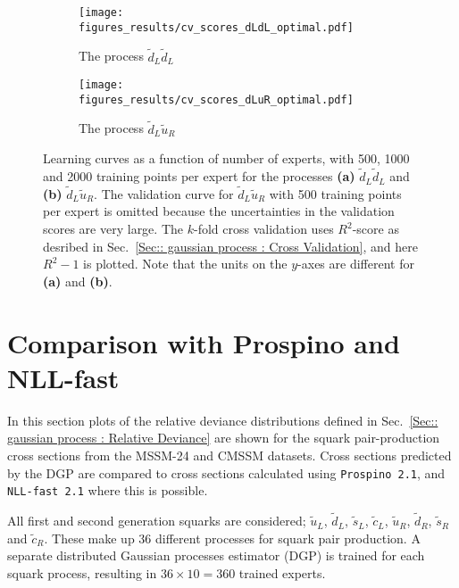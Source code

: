 \documentclass[twoside,english]{uiofysmaster}
\begin{document}
{{\begin{figure}
    \centering
    \begin{subfigure}[b]{0.7\textwidth}
        \texttt{[image: figures\_results/cv\_scores\_dLdL\_optimal.pdf]}
        \caption{The process $\widetilde{d}_L \widetilde{d}_L$}
        \label{Fig:: results : Learning curves dLdL}
    \end{subfigure}
    \begin{subfigure}[b]{0.7\textwidth}
        \texttt{[image: figures\_results/cv\_scores\_dLuR\_optimal.pdf]}
        \caption{The process $\widetilde{d}_L \widetilde{u}_R$}
        \label{Fig :: results : Learning curves dLuL}
    \end{subfigure}
    \caption{Learning curves as a function of number of experts, with 500, 1000 and 2000 training points per expert for the processes \textbf{(a)} $\widetilde{d}_L \widetilde{d}_L$ and \textbf{(b)} $\widetilde{d}_L\widetilde{u}_R$. The validation curve for $\widetilde{d}_L \widetilde{u}_R$ with 500 training points per expert is omitted because the uncertainties in the validation scores are very large. The $k$-fold cross validation uses $R^2$-score as desribed in Sec.~\ref{Sec:: gaussian process : Cross Validation}, and here $R^2-1$ is plotted. Note that the units on the $y$-axes are different for \textbf{(a)} and \textbf{(b)}.}
\label{Fig:: results : Learning curves}
\end{figure}


\section{Comparison with Prospino and NLL-fast}

In this section plots of the relative deviance distributions defined in Sec.~\ref{Sec:: gaussian process : Relative Deviance} are shown for the squark pair-production cross sections from the MSSM-24 and CMSSM datasets. Cross sections predicted by the DGP are compared to cross sections calculated using \verb|Prospino 2.1|, and \verb|NLL-fast 2.1| where this is possible. 

All first and second generation squarks are considered; $\widetilde{u}_L$, $\widetilde{d}_L$, $\widetilde{s}_L$, $\widetilde{c}_L$, $\widetilde{u}_R$, $\widetilde{d}_R$, $\widetilde{s}_R$ and $\widetilde{c}_R$. These make up 36 different processes for squark pair production. A separate distributed Gaussian processes estimator (DGP) is trained for each squark process, resulting in $36 \times 10 = 360$ trained experts. 

}}
\end{document}
